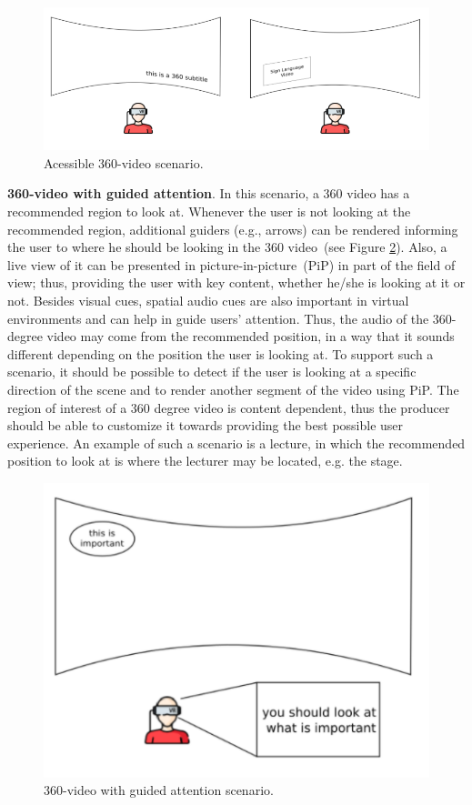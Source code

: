 \begin{figure}[!ht]
    \centering
    \includegraphics[width=0.8\linewidth]{img/video360/accessible.png}
    \caption{Acessible 360-video scenario.}
    \label{fig:cenario_acessivel}
\end{figure}

\textbf{360-video with guided attention}.
In this scenario, a 360 video has a recommended region to look at.
Whenever the user is not looking at the recommended region, additional guiders
(e.g., arrows) can be rendered informing the user to where he should be
looking in the 360 video~(see Figure \ref{fig:cenario_guiado}).
Also, a live view of it can be presented in picture-in-picture~(PiP) in part
of the field of view; thus, providing the user with key content, whether he/she is looking at it or
not.
Besides visual cues, spatial audio cues are also important in virtual
environments and can help in guide users' attention.
Thus, the audio of the 360-degree video may come from the recommended
position, in a way that it sounds different depending on the position the user
is looking at. 
To support such a scenario, it should be possible to detect if the user is
looking at a specific direction of the scene and to render another segment of
the video using PiP.
The region of interest of a 360 degree video is content dependent, thus the
producer should be able to customize it towards providing the best possible
user experience.
An example of such a scenario is a lecture, in which the recommended position
to look at is where the lecturer may be located, e.g. the stage.

\begin{figure}[!ht]
    \centering
    \includegraphics[width=0.4\linewidth]{img/video360/guided.png}
    \caption{360-video with guided attention scenario.}
    \label{fig:cenario_guiado}
\end{figure}

